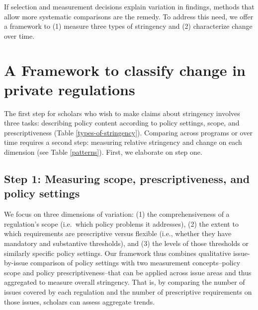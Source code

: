 \documentclass[
      12pt,
            Review ]{article}
\begin{document}
If selection and measurement decisions explain variation in findings, methods that allow more systematic comparisons are the remedy. To address this need, we offer a framework to (1) measure three types of stringency and (2) characterize change over time.

\hypertarget{a-framework-to-classify-change-in-private-regulations}{%
\section{A Framework to classify change in private regulations}\label{a-framework-to-classify-change-in-private-regulations}}

The first step for scholars who wish to make claims about stringency involves three tasks: describing policy content according to policy settings, scope, and prescriptiveness (Table \ref{types-of-stringency}). Comparing across programs or over time requires a second step: measuring relative stringency and change on each dimension (see Table \ref{patterns}). First, we elaborate on step one.

\hypertarget{step-1-measuring-scope-prescriptiveness-and-policy-settings}{%
\subsection{Step 1: Measuring scope, prescriptiveness, and policy settings}\label{step-1-measuring-scope-prescriptiveness-and-policy-settings}}

We focus on three dimensions of variation: (1) the comprehensiveness of a regulation's scope (i.e.~which policy problems it addresses), (2) the extent to which requirements are prescriptive versus flexible (i.e., whether they have mandatory and substantive thresholds), and (3) the levels of those thresholds or similarly specific policy settings. Our framework thus combines qualitative issue-by-issue comparison of policy settings with two measurement concepts--policy scope and policy prescriptiveness--that can be applied across issue areas and thus aggregated to measure overall stringency. That is, by comparing the number of issues covered by each regulation and the number of prescriptive requirements on those issues, scholars can assess aggregate trends.


\end{document}
